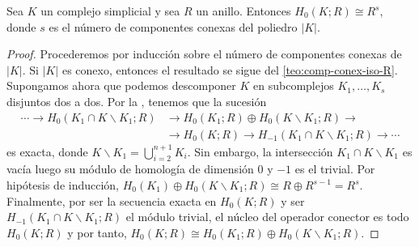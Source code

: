 \begin{corolario}
	Sea \(K\) un complejo simplicial y sea \(R\) un anillo. Entonces \(H_0(K; R) \cong R^s\), donde \(s\) es el número de componentes conexas del poliedro \(|K|\).
\end{corolario}
\begin{proof}
	Procederemos por inducción sobre el número de componentes conexas de \(|K|\). Si \(|K|\) es conexo, entonces el resultado se sigue del \autoref{teo:comp-conex-iso-R}. Supongamos ahora que podemos descomponer \(K\) en subcomplejos \(K_1, \ldots, K_{s}\) disjuntos dos a dos. Por la , tenemos que la sucesión
	\begin{align}
	\cdots \to H_{0}\left(K_{1}\cap K \backslash K_1;R\right) &\to  H_{0}(K_{1};R) \oplus H_0\left( K \backslash K_1;R\right) \to \\ &\to H_{0}(K;R) \to H_{-1}\left(K_{1}\cap K \backslash K_1;R\right) \to \cdots
	\end{align}
	es exacta, donde \(K \backslash K_1 = \bigcup_{i=2}^{n+1} K_{i}\). Sin embargo, la intersección \(K_{1}\cap K \backslash K_1\) es vacía luego su módulo de homología de dimensión \(0\) y \(-1\) es el trivial. Por hipótesis de inducción, \( H_0(K_1) \oplus H_0(K \backslash K_1;R) \cong R \oplus R^{s-1} = R^s\). Finalmente, por ser la secuencia exacta en \(H_0(K;R)\) y ser \(H_{-1}\left(K_{1}\cap K \backslash K_1;R\right)\) el módulo trivial, el núcleo del operador conector es todo \(H_0(K;R)\) y por tanto, \(H_0(K;R) \cong H_{0}(K_{1};R) \oplus H_0\left( K \backslash K_1;R\right)\).
\end{proof}

